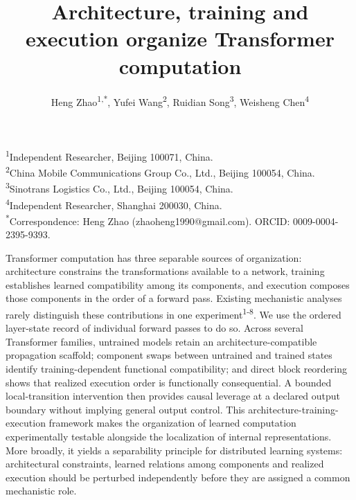 \documentclass[12pt]{article}
\title{Architecture, training and execution organize Transformer computation}
\author{Heng Zhao\textsuperscript{1,*}, Yufei Wang\textsuperscript{2}, Ruidian Song\textsuperscript{3}, Weisheng Chen\textsuperscript{4}}
\date{}
\begin{document}
\maketitle
\begin{center}\small
\textsuperscript{1}Independent Researcher, Beijing 100071, China.\\
\textsuperscript{2}China Mobile Communications Group Co., Ltd., Beijing 100054, China.\\
\textsuperscript{3}Sinotrans Logistics Co., Ltd., Beijing 100054, China.\\
\textsuperscript{4}Independent Researcher, Shanghai 200030, China.\\
\textsuperscript{*}Correspondence: Heng Zhao (zhaoheng1990@gmail.com). ORCID: 0009-0004-2395-9393.
\end{center}
\doublespacing
\modulolinenumbers[5]
\linenumbers
\begin{center}\begin{minipage}{0.91\linewidth}\small\noindent\bfseries

Transformer computation has three separable sources of organization: architecture constrains the transformations available to a network, training establishes learned compatibility among its components, and execution composes those components in the order of a forward pass. Existing mechanistic analyses rarely distinguish these contributions in one experiment\textsuperscript{1-8}. We use the ordered layer-state record of individual forward passes to do so. Across several Transformer families, untrained models retain an architecture-compatible propagation scaffold; component swaps between untrained and trained states identify training-dependent functional compatibility; and direct block reordering shows that realized execution order is functionally consequential. A bounded local-transition intervention then provides causal leverage at a declared output boundary without implying general output control. This architecture-training-execution framework makes the organization of learned computation experimentally testable alongside the localization of internal representations. More broadly, it yields a separability principle for distributed learning systems: architectural constraints, learned relations among components and realized execution should be perturbed independently before they are assigned a common mechanistic role.

\normalfont
\end{minipage}\end{center}
\end{document}
